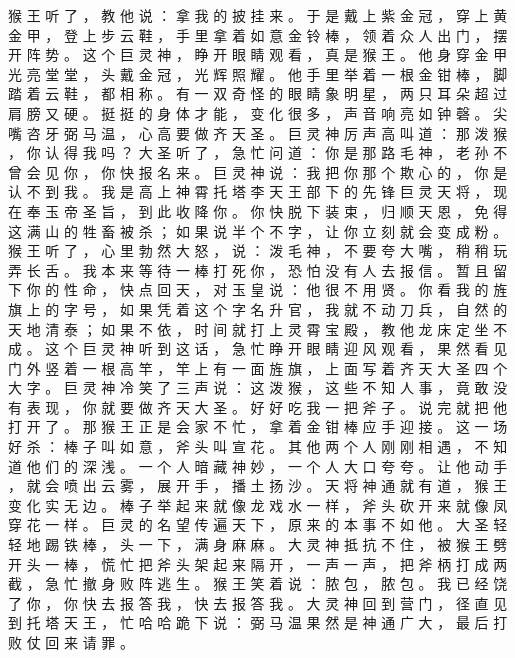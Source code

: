 {猴 王 听 了 ， 教 他 说 ： 拿 我 的 披 挂 来 。
于 是 戴 上 紫 金 冠 ， 穿 上 黄 金 甲 ， 登 上 步 云 鞋 ， 手 里 拿 着 如 意 金 铃 棒 ， 领 着 众 人 出 门 ， 摆 开 阵 势 。
这 个 巨 灵 神 ， 睁 开 眼 睛 观 看 ， 真 是 猴 王 。 他 身 穿 金 甲 光 亮 堂 堂 ， 头 戴 金 冠 ， 光 辉 照 耀 。
他 手 里 举 着 一 根 金 钳 棒 ， 脚 踏 着 云 鞋 ， 都 相 称 。
有 一 双 奇 怪 的 眼 睛 象 明 星 ， 两 只 耳 朵 超 过 肩 膀 又 硬 。
挺 挺 的 身 体 才 能 ， 变 化 很 多 ， 声 音 响 亮 如 钟 磬 。
尖 嘴 咨 牙 弼 马 温 ， 心 高 要 做 齐 天 圣 。
巨 灵 神 厉 声 高 叫 道 ： 那 泼 猴 ， 你 认 得 我 吗 ？ 大 圣 听 了 ， 急 忙 问 道 ： 你 是 那 路 毛 神 ， 老 孙 不 曾 会 见 你 ， 你 快 报 名 来 。
巨 灵 神 说 ： 我 把 你 那 个 欺 心 的 ， 你 是 认 不 到 我 。
我 是 高 上 神 霄 托 塔 李 天 王 部 下 的 先 锋 巨 灵 天 将 ， 现 在 奉 玉 帝 圣 旨 ， 到 此 收 降 你 。
你 快 脱 下 装 束 ， 归 顺 天 恩 ， 免 得 这 满 山 的 牲 畜 被 杀 ； 如 果 说 半 个 不 字 ， 让 你 立 刻 就 会 变 成 粉 。
猴 王 听 了 ， 心 里 勃 然 大 怒 ， 说 ： 泼 毛 神 ， 不 要 夸 大 嘴 ， 稍 稍 玩 弄 长 舌 。
我 本 来 等 待 一 棒 打 死 你 ， 恐 怕 没 有 人 去 报 信 。
暂 且 留 下 你 的 性 命 ， 快 点 回 天 ， 对 玉 皇 说 ： 他 很 不 用 贤 。
你 看 我 的 旌 旗 上 的 字 号 ， 如 果 凭 着 这 个 字 名 升 官 ， 我 就 不 动 刀 兵 ， 自 然 的 天 地 清 泰 ； 如 果 不 依 ， 时 间 就 打 上 灵 霄 宝 殿 ， 教 他 龙 床 定 坐 不 成 。
这 个 巨 灵 神 听 到 这 话 ， 急 忙 睁 开 眼 睛 迎 风 观 看 ， 果 然 看 见 门 外 竖 着 一 根 高 竿 ， 竿 上 有 一 面 旌 旗 ， 上 面 写 着 齐 天 大 圣 四 个 大 字 。
巨 灵 神 冷 笑 了 三 声 说 ： 这 泼 猴 ， 这 些 不 知 人 事 ， 竟 敢 没 有 表 现 ， 你 就 要 做 齐 天 大 圣 。
好 好 吃 我 一 把 斧 子 。
说 完 就 把 他 打 开 了 。
那 猴 王 正 是 会 家 不 忙 ， 拿 着 金 钳 棒 应 手 迎 接 。
这 一 场 好 杀 ： 棒 子 叫 如 意 ， 斧 头 叫 宣 花 。
其 他 两 个 人 刚 刚 相 遇 ， 不 知 道 他 们 的 深 浅 。
一 个 人 暗 藏 神 妙 ， 一 个 人 大 口 夸 夸 。
让 他 动 手 ， 就 会 喷 出 云 雾 ， 展 开 手 ， 播 土 扬 沙 。
天 将 神 通 就 有 道 ， 猴 王 变 化 实 无 边 。
棒 子 举 起 来 就 像 龙 戏 水 一 样 ， 斧 头 砍 开 来 就 像 凤 穿 花 一 样 。
巨 灵 的 名 望 传 遍 天 下 ， 原 来 的 本 事 不 如 他 。 大 圣 轻 轻 地 踢 铁 棒 ， 头 一 下 ， 满 身 麻 麻 。
大 灵 神 抵 抗 不 住 ， 被 猴 王 劈 开 头 一 棒 ， 慌 忙 把 斧 头 架 起 来 隔 开 ， 一 声 一 声 ， 把 斧 柄 打 成 两 截 ， 急 忙 撤 身 败 阵 逃 生 。
猴 王 笑 着 说 ： 脓 包 ， 脓 包 。
我 已 经 饶 了 你 ， 你 快 去 报 答 我 ， 快 去 报 答 我 。
大 灵 神 回 到 营 门 ， 径 直 见 到 托 塔 天 王 ， 忙 哈 哈 跪 下 说 ： 弼 马 温 果 然 是 神 通 广 大 ， 最 后 打 败 仗 回 来 请 罪 。
}
